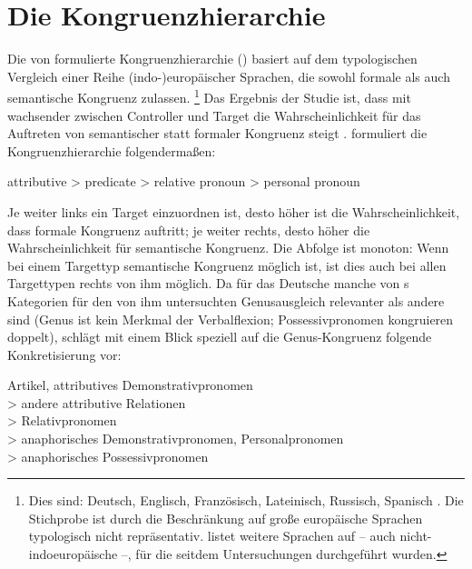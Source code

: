 \section{Die Kongruenzhierarchie}
\label{sec:kongrhier}

Die von \citet{corbett1979} formulierte Kongruenzhierarchie () basiert auf dem typologischen Vergleich einer Reihe
(indo-)europäischer Sprachen, die sowohl formale als auch semantische Kongruenz
zulassen.%
%
	\footnote{Dies sind: Deutsch, Englisch, Französisch, Lateinisch, Russisch,
	Spanisch \citep[214--215]{corbett1979}. Die Stichprobe ist durch die
	Beschränkung auf große europäische Sprachen typologisch nicht
	repräsentativ. \citet[218]{corbett2006} listet weitere Sprachen auf -- auch
	nicht-indoeuropäische --, für die seitdem Untersuchungen durchgeführt
	wurden.}
%
Das Ergebnis der Studie ist, dass mit wachsender  zwischen
Controller und Target die Wahrscheinlichkeit für das Auftreten von
semantischer statt formaler Kongruenz steigt \citep[218--223]{corbett1979}.
\citet[204]{corbett1979} formuliert die Kongruenzhierarchie folgendermaßen:

\begin{exe}
\ex attributive > predicate > relative pronoun > personal pronoun
\end{exe}

Je weiter links ein Target einzuordnen ist, desto höher ist die
Wahrscheinlichkeit, dass formale Kongruenz auftritt; je weiter rechts, desto
höher die Wahrscheinlichkeit für semantische Kongruenz. Die Abfolge ist
monoton: Wenn bei einem Targettyp semantische Kongruenz möglich ist, ist dies
auch bei allen Targettypen rechts von ihm möglich. Da für das Deutsche manche
von \citeauthor{corbett1979}s Kategorien für den von ihm untersuchten
Genusausgleich relevanter als andere sind (Genus ist kein Merkmal der
Verbalflexion; Possessivpronomen kongruieren doppelt), schlägt
\citet[193]{fleischer2012} mit einem Blick speziell auf die Genus-Kongruenz
folgende Konkretisierung vor:

\begin{exe}
\ex Artikel, attributives Demonstrativpronomen \\
	\hspace*{1em} > andere attributive Relationen \\
	\hspace*{2em} > Relativpronomen \\
	\hspace*{3em} > anaphorisches Demonstrativpronomen, Personalpronomen \\
	\hspace*{4em} > anaphorisches Possessivpronomen
\end{exe}

